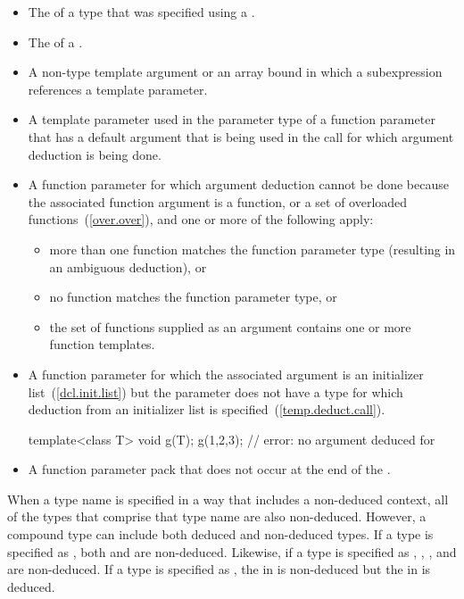 %
\begin{itemize}
\item
The
of a type that was specified using a
.
\item
The  of a .
\item
A non-type template argument or an array bound in which a subexpression
references a template parameter.
\item
A template parameter used in the parameter type of a function parameter that
has a default argument that is being used in the call for which argument
deduction is being done.
\item
A function parameter for which argument deduction cannot be done because the
associated function argument is a function, or a set of overloaded
functions~(\ref{over.over}), and one or more of the following apply:
\begin{itemize}
\item
more than one function matches the function parameter type (resulting in
an ambiguous deduction), or
\item
no function matches the function parameter type, or
\item
the set of functions supplied as an argument contains one or more function templates.
\end{itemize}
\item A function parameter for which the associated argument is an initializer
list~(\ref{dcl.init.list}) but the parameter does not have
a type for which deduction from an initializer list is specified~(\ref{temp.deduct.call}).
\enterexample
\begin{codeblock}
template<class T> void g(T);
g({1,2,3});                 // error: no argument deduced for 
\end{codeblock}
\exitexample
\item A function parameter pack that does not occur at the end of the 
.
\end{itemize}

\pnum
When a type name is specified in a way that includes a non-deduced
context, all of the types that comprise that type name are also
non-deduced.
However, a compound type can include both deduced and non-deduced types.
\enterexample
If a type is specified as
,
both
and
are non-deduced.
Likewise, if a type is specified as
,
,
,
and
are non-deduced.
If a type is specified as
,
the
in
is non-deduced but
the
in
is deduced.
\exitexample

